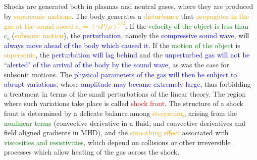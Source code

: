 \documentclass[12pt,a4paper]{article}
\begin{document}
Shocks are generated both in plasmas and neutral gases, where they are produced by \textcolor{orange}{supersonic motions}. The body generates a \textcolor{orange}{disturbance} that \textcolor{orange}{propagates in the gas at the sound speed $c_s = (\gamma P/\rho)^{1/2}$}. If the \textcolor{green}{velocity of the object is less than $c_s$} (\textcolor{orange}{subsonic motion}), the \textcolor{blue}{perturbation}, namely the \textcolor{blue}{compressive sound wave}, will \textcolor{blue}{always move ahead of the body which caused it}. If the \textcolor{green}{motion of the object} is \textcolor{orange}{supersonic}, the \textcolor{blue}{perturbation will lag behind} and the \textcolor{blue}{unperturbed gas will not be ``alerted" of the arrival of the body by the sound wave}, as was the case for subsonic motions. The \textcolor{blue}{physical parameters of the gas will then be subject to abrupt variations}, whose \textcolor{blue}{amplitude may became extremely large}, thus forbidding a treatment in terms of the small perturbations of the linear theory. The region where such variations take place is called \textcolor{red}{shock front}. The structure of a shock front is determined by a delicate balance among \textcolor{orange}{steepening}, arising from the \textcolor{green}{nonlinear terms} (convective derivative in a fluid, and convective derivatives and field aligned gradients in MHD), and the \textcolor{orange}{smoothing effect} associated with \textcolor{green}{viscosities and resistivities}, which depend on collisions or other irreversible processes which allow heating of the gas across the shock.
\end{document}
